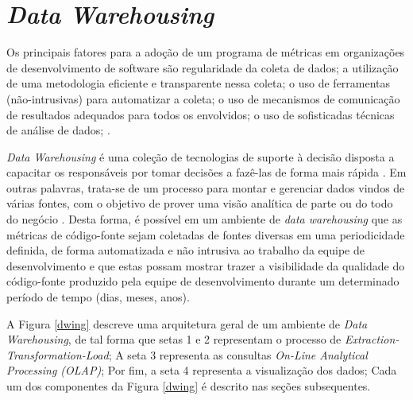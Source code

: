 \chapter{\textit{Data Warehousing}} 

Os principais fatores para a adoção de um programa de métricas em 
organizações de desenvolvimento de software são
regularidade da coleta de dados;
a utilização de uma metodologia eficiente e transparente nessa coleta; 
o uso de ferramentas (não-intrusivas) para automatizar a coleta; 
o uso de mecanismos de comunicação de resultados adequados para todos os envolvidos; 
o uso de sofisticadas técnicas de análise de dados;
.



\textit{Data Warehousing} é uma coleção de tecnologias de suporte à decisão disposta a capacitar os responsáveis por tomar decisões a fazê-las de forma mais rápida . Em outras palavras, trata-se de um processo para montar e gerenciar dados vindos de várias fontes, com o objetivo de prover uma visão analítica de parte ou do todo do negócio \cite{gardner1998}. Desta forma, é possível em um ambiente de \textit{data warehousing} que as métricas de código-fonte sejam coletadas de fontes diversas em uma periodicidade definida, de forma automatizada e não intrusiva ao trabalho da equipe de desenvolvimento e que estas possam mostrar trazer a visibilidade da qualidade do código-fonte produzido pela equipe de desenvolvimento durante um determinado período de tempo (dias, meses, anos). 

A Figura \ref{dwing} descreve uma arquitetura geral de um ambiente de \textit{Data Warehousing}, de tal forma que setas 1 e 2 representam o processo de \textit{Extraction-Transformation-Load}; A seta 3 representa as consultas \textit{On-Line Analytical Processing (OLAP)}; Por fim, a seta 4 representa a visualização dos dados; Cada um dos componentes da Figura \ref{dwing} é descrito nas seções subsequentes.

